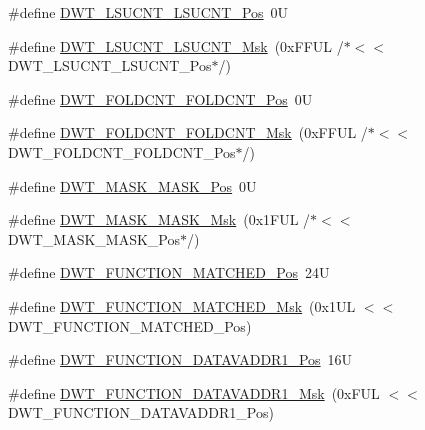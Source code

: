 \begin{DoxyCompactItemize}
\item 
\#define \mbox{\hyperlink{group___c_m_s_i_s___d_w_t_gab9394c7911b0b4312a096dad91d53a3d}{D\+W\+T\+\_\+\+L\+S\+U\+C\+N\+T\+\_\+\+L\+S\+U\+C\+N\+T\+\_\+\+Pos}}~0U
\item 
\#define \mbox{\hyperlink{group___c_m_s_i_s___d_w_t_ga2186d7fc9317e20bad61336ee2925615}{D\+W\+T\+\_\+\+L\+S\+U\+C\+N\+T\+\_\+\+L\+S\+U\+C\+N\+T\+\_\+\+Msk}}~(0x\+F\+F\+U\+L /$\ast$$<$$<$ D\+W\+T\+\_\+\+L\+S\+U\+C\+N\+T\+\_\+\+L\+S\+U\+C\+N\+T\+\_\+\+Pos$\ast$/)
\item 
\#define \mbox{\hyperlink{group___c_m_s_i_s___d_w_t_ga7f8af5ac12d178ba31a516f6ed141455}{D\+W\+T\+\_\+\+F\+O\+L\+D\+C\+N\+T\+\_\+\+F\+O\+L\+D\+C\+N\+T\+\_\+\+Pos}}~0U
\item 
\#define \mbox{\hyperlink{group___c_m_s_i_s___d_w_t_ga9cb73d0342d38b14e41027d3c5c02647}{D\+W\+T\+\_\+\+F\+O\+L\+D\+C\+N\+T\+\_\+\+F\+O\+L\+D\+C\+N\+T\+\_\+\+Msk}}~(0x\+F\+F\+U\+L /$\ast$$<$$<$ D\+W\+T\+\_\+\+F\+O\+L\+D\+C\+N\+T\+\_\+\+F\+O\+L\+D\+C\+N\+T\+\_\+\+Pos$\ast$/)
\item 
\#define \mbox{\hyperlink{group___c_m_s_i_s___d_w_t_gaf798ae34e2b9280ea64f4d9920cd2e7d}{D\+W\+T\+\_\+\+M\+A\+S\+K\+\_\+\+M\+A\+S\+K\+\_\+\+Pos}}~0U
\item 
\#define \mbox{\hyperlink{group___c_m_s_i_s___d_w_t_gadd798deb0f1312feab4fb05dcddc229b}{D\+W\+T\+\_\+\+M\+A\+S\+K\+\_\+\+M\+A\+S\+K\+\_\+\+Msk}}~(0x1\+F\+U\+L /$\ast$$<$$<$ D\+W\+T\+\_\+\+M\+A\+S\+K\+\_\+\+M\+A\+S\+K\+\_\+\+Pos$\ast$/)
\item 
\#define \mbox{\hyperlink{group___c_m_s_i_s___d_w_t_ga22c5787493f74a6bacf6ffb103a190ba}{D\+W\+T\+\_\+\+F\+U\+N\+C\+T\+I\+O\+N\+\_\+\+M\+A\+T\+C\+H\+E\+D\+\_\+\+Pos}}~24U
\item 
\#define \mbox{\hyperlink{group___c_m_s_i_s___d_w_t_gac8b1a655947490280709037808eec8ac}{D\+W\+T\+\_\+\+F\+U\+N\+C\+T\+I\+O\+N\+\_\+\+M\+A\+T\+C\+H\+E\+D\+\_\+\+Msk}}~(0x1\+U\+L $<$$<$ D\+W\+T\+\_\+\+F\+U\+N\+C\+T\+I\+O\+N\+\_\+\+M\+A\+T\+C\+H\+E\+D\+\_\+\+Pos)
\item 
\#define \mbox{\hyperlink{group___c_m_s_i_s___d_w_t_ga8b75e8ab3ffd5ea2fa762d028dc30e8c}{D\+W\+T\+\_\+\+F\+U\+N\+C\+T\+I\+O\+N\+\_\+\+D\+A\+T\+A\+V\+A\+D\+D\+R1\+\_\+\+Pos}}~16U
\item 
\#define \mbox{\hyperlink{group___c_m_s_i_s___d_w_t_gafdbf5a8c367befe8661a4f6945c83445}{D\+W\+T\+\_\+\+F\+U\+N\+C\+T\+I\+O\+N\+\_\+\+D\+A\+T\+A\+V\+A\+D\+D\+R1\+\_\+\+Msk}}~(0x\+F\+U\+L $<$$<$ D\+W\+T\+\_\+\+F\+U\+N\+C\+T\+I\+O\+N\+\_\+\+D\+A\+T\+A\+V\+A\+D\+D\+R1\+\_\+\+Pos)

\end{DoxyCompactItemize}
